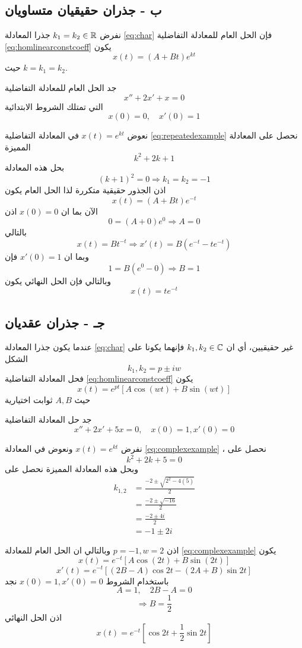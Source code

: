\subsection*{ب - جذران حقيقيان متساويان}
نفرض $k_1=k_2\in\mathbb{R}$ جذرا المعادلة \eqref{eq:char} فإن الحل العام للمعادلة التفاضلية \eqref{eq:homlinearconstcoeff} يكون
\[
x(t) = (A + Bt) e^{kt}
\]
حيث $k=k_1=k_2$.

\begin{example}
	جد الحل العام للمعادلة التفاضلية
	\begin{equation}
		\label{eq:repeatedexample}
		x'' + 2x' + x = 0
	\end{equation}
	التي تمتلك الشروط الابتدائية
	\[
	x(0) = 0,\quad x'(0) = 1
	\]
\end{example}
\begin{solution}
	نعوض $x(t) = e^{kt}$ في المعادلة التفاضلية \eqref{eq:repeatedexample} نحصل على المعادلة المميزة
	\[
	k^2 + 2k + 1
	\]
	بحل هذه المعادلة 
	\[
	(k+1)^2 = 0\Rightarrow k_1 = k_2 = -1
	\]
	اذن الجذور حقيقية متكررة لذا الحل العام يكون
	\[
	x(t) = (A + Bt) e^{-t}
	\]
	الآن بما ان $x(0) = 0$ اذن
	\[
	0 = (A + 0) e^0 \Rightarrow A=0
	\]
	بالتالي
	\[
	x(t) = Bt^{-t} \Rightarrow x'(t) = B(e^{-t} - te^{-t})
	\]
	وبما ان $ x'(0) = 1 $ فإن 
	\[
	1 = B(e^0  -0 ) \Rightarrow B = 1
	\]
	وبالتالي فإن الحل النهائي يكون
	\[
	x(t) = t e^{-t}
	\]
\end{solution}

\subsection*{جـ - جذران عقديان}
عندما يكون جذرا المعادلة \eqref{eq:char} غير حقيقيين، أي ان $k_1,k_2\in \mathbb{C}$ فإنهما يكونا على الشكل
\[
k_1, k_2 = p \pm iw
\]
فحل المعادلة التفاضلية \eqref{eq:homlinearconstcoeff} يكون
\[
x(t) = e^{pt} [A \cos(wt) + B \sin(wt)]
\]
حيث $A, B$ ثوابت اختيارية
\newpage
\begin{example}
	جد حل المعادلة التفاضلية
	\begin{equation}
		\label{eq:complexexample}
		x'' + 2x' + 5x = 0, \quad x(0) = 1, x'(0) = 0
	\end{equation}
\end{example}
\begin{solution}
	نفرض $x(t) = e^{kt}$ ونعوض في المعادلة \eqref{eq:complexexample} ، نحصل على
	\[
	k^2 + 2k + 5= 0
	\]
	وبحل هذه المعادلة المميزة نحصل على
	\begin{align*}
		k_{1,2} &= \frac{-2 \pm \sqrt{2^2 - 4(5)}}{2}\\
		&= \frac{-2\pm \sqrt{-16}}{2}\\
		&= \frac{-2 \pm 4i}{2}\\
		&= -1 \pm 2i
	\end{align*}
\end{solution}
اذن $p=-1,w=2$ وبالتالي ان الحل العام للمعادلة \eqref{eq:complexexample} يكون
\[
x(t) = e^{-t} [A \cos(2t) + B \sin(2t)]
\]
\[
x'(t) = e^{-t} [(2B-A)\cos 2t - (2A + B)\sin 2t]
\]
باستخدام الشروط $x(0) = 1, x'(0) =0$ نجد
\[
A =1,\quad 2B - A = 0 
\]
\[
\Rightarrow B = \frac{1}{2}
\]
اذن الحل النهائي
\[
x(t) = e^{-t} [\cos 2t + \frac{1}{2} \sin 2t]
\]

